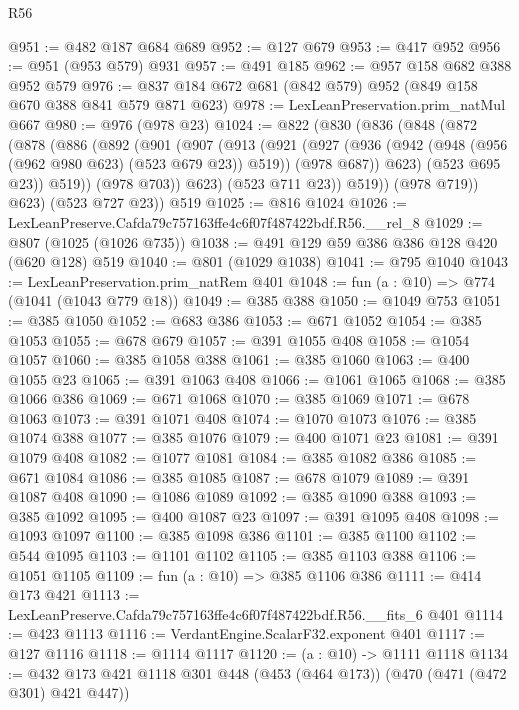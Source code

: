 \begin{lexlean}{R56}
\begin{coremodule}
@951 := @482 @187 @684 @689
@952 := @127 @679
@953 := @417 @952
@956 := @951 (@953 @579) @931
@957 := @491 @185
@962 := @957 @158 @682 @388 @952 @579
@976 := @837 @184 @672 @681 (@842 @579) @952 (@849 @158 @670 @388 @841 @579 @871 @623)
@978 := LexLeanPreservation.prim_natMul @667
@980 := @976 (@978 @23)
@1024 := @822
    (@830
      (@836
        (@848
          (@872
            (@878
              (@886
                (@892
                  (@901
                    (@907
                      (@913
                        (@921
                          (@927
                            (@936
                              (@942 (@948 (@956 (@962 @980 @623) (@523 @679 @23)) @519))
                              (@978 @687))
                            @623)
                          (@523 @695 @23))
                        @519))
                    (@978 @703))
                  @623)
                (@523 @711 @23))
              @519))
          (@978 @719))
        @623)
      (@523 @727 @23))
    @519
@1025 := @816 @1024
@1026 := LexLeanPreserve.Cafda79c757163ffe4c6f07f487422bdf.R56.__rel_8
@1029 := @807 (@1025 (@1026 @735))
@1038 := @491 @129 @59 @386 @386 @128 @420 (@620 @128) @519
@1040 := @801 (@1029 @1038)
@1041 := @795 @1040
@1043 := LexLeanPreservation.prim_natRem @401
@1048 := fun (a : @10) => @774 (@1041 (@1043 @779 @18))
@1049 := @385 @388
@1050 := @1049 @753
@1051 := @385 @1050
@1052 := @683 @386
@1053 := @671 @1052
@1054 := @385 @1053
@1055 := @678 @679
@1057 := @391 @1055 @408
@1058 := @1054 @1057
@1060 := @385 @1058 @388
@1061 := @385 @1060
@1063 := @400 @1055 @23
@1065 := @391 @1063 @408
@1066 := @1061 @1065
@1068 := @385 @1066 @386
@1069 := @671 @1068
@1070 := @385 @1069
@1071 := @678 @1063
@1073 := @391 @1071 @408
@1074 := @1070 @1073
@1076 := @385 @1074 @388
@1077 := @385 @1076
@1079 := @400 @1071 @23
@1081 := @391 @1079 @408
@1082 := @1077 @1081
@1084 := @385 @1082 @386
@1085 := @671 @1084
@1086 := @385 @1085
@1087 := @678 @1079
@1089 := @391 @1087 @408
@1090 := @1086 @1089
@1092 := @385 @1090 @388
@1093 := @385 @1092
@1095 := @400 @1087 @23
@1097 := @391 @1095 @408
@1098 := @1093 @1097
@1100 := @385 @1098 @386
@1101 := @385 @1100
@1102 := @544 @1095
@1103 := @1101 @1102
@1105 := @385 @1103 @388
@1106 := @1051 @1105
@1109 := fun (a : @10) => @385 @1106 @386
@1111 := @414 @173 @421
@1113 := LexLeanPreserve.Cafda79c757163ffe4c6f07f487422bdf.R56.__fits_6 @401
@1114 := @423 @1113
@1116 := VerdantEngine.ScalarF32.exponent @401
@1117 := @127 @1116
@1118 := @1114 @1117
@1120 := (a : @10) -> @1111 @1118
@1134 := @432 @173 @421 @1118 @301 @448 (@453 (@464 @173)) (@470 (@471 (@472 @301) @421 @447))

\end{coremodule}
\end{lexlean}
